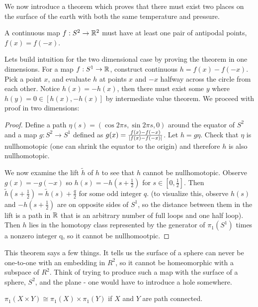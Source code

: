 \documentclass[10pt]{article}
\begin{document}
We now introduce a theorem which proves that there must exist two places on the surface of the earth with both the same temperature and pressure.

\begin{theorem}
	A continuous map $f: S^2 \to \mathbb{R}^2$ must have at least one pair of antipodal points, $f(x) = f(-x)$.
\end{theorem}

Lets build intuition for the two dimensional case by proving the theorem in one dimensions. For a map $f: S^1 \to \mathbb{R}$, construct continuous $h = f(x) - f(-x)$. Pick a point $x$, and evaluate $h$ at points $x$ and $-x$ halfway across the circle from each other. Notice $h(x) = -h(x)$, then there must exist some $y$ where $h(y) = 0 \in [h(x), -h(x)]$ by intermediate value theorem. We proceed with proof in two dimensions:

\begin{proof}
	Define a path $\eta(s) = (\cos 2\pi s, \sin 2\pi s, 0)$ around the equator of $S^2$ and a map $g: S^2 \to S^1$ defined as $g(x) = \frac{f(x) - f(-x)}{\lvert f(x) - f(-x)\rvert}$. Let $h = g\eta$. Check that $\eta$ is nullhomotopic (one can shrink the equator to the origin) and therefore $h$ is also nullhomotopic. 

	\indent We now examine the lift $\tilde{h}$ of $h$ to see that $h$ cannot be nullhomotopic. Observe $g(x) = -g(-x)$ so $h(s) = -h(s + \frac 1 2)$ for $s \in [0, \frac 1 2]$. Then $\tilde{h}(s + \frac 1 2) = \tilde{h}(s) + \frac q 2$ for some odd integer $q$. (to visualize this, observe $h(s)$ and $-h(s + \frac 1 2)$ are on opposite sides of $S^1$, so the distance between them in the lift is a path in $\mathbb{R}$ that is an arbitrary number of full loops and one half loop). Then $h$ lies in the homotopy class represented by the generator of $\pi_1(S^1)$ times a nonzero integer q, so it cannot be nullhomootpic.
\end{proof}

This theorem says a few things. It tells us the surface of a sphere can never be one-to-one with an embedding in $R^2$, so it cannot be homeomorphic with a subspace of $R^2$. Think of trying to produce such a map with the surface of a sphere, $S^2$, and the plane - one would have to introduce a hole somewhere.


\begin{theorem}
	$\pi_1(X \times Y) \cong \pi_1(X) \times \pi_1(Y)$ if $X$ and $Y$ are path connected.
\end{theorem}
\end{document}
